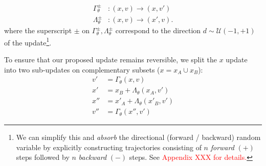\documentclass[a4paper,11pt]{article}
\begin{document}
\begin{align}
\Gamma^{\pm}_{\theta}&: (x, v) \rightarrow (x, v') \\
\Lambda^{\pm}_{\theta}&: (x, v) \rightarrow (x', v).
\end{align}
%
where the superscript $\pm$ on $\Gamma^{\pm}_{\theta}, \Lambda^{\pm}_{\theta}$ correspond to the direction $d \sim \mathcal{U}(-1, +1)$ of the update\footnote{We can simplify this and \textit{absorb} the directional (forward / backward) random variable by explicitly constructing trajectories consisting of $n$ \textit{forward} $(+)$ steps followed by $n$ \emph{backward} $(-)$ steps. See \textcolor{red}{Appendix XXX for details.}}.
%

To ensure that our proposed update remains reversible, we split the $x$ update into two sub-updates on complementary subsets ($x = x_{A} \cup x_{B}$):
%
\begin{align}
v' &= \Gamma_{\theta}(x, v) \\
x' &= x_{B} + \Lambda_{\theta}(x_{A}, v') \\
x'' &= x'_{A} + \Lambda_{\theta}(x'_{B}, v') \\
v'' &= \Gamma_{\theta}(x'', v')
\end{align}
%
%
\end{document}
